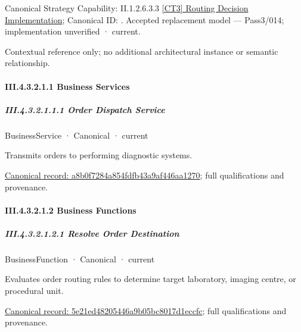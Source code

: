 {\small Canonical Strategy Capability: II.1.2.6.3.3 \hyperref[element:2272dc936e6a4243a12049cd007df5d5]{[CT3] Routing Decision Implementation}; Canonical ID: \texttt{}. Accepted replacement model — Pass3/014; implementation unverified · current.}\par
Contextual reference only; no additional architectural instance or semantic relationship.\par
\paragraph*{III.4.3.2.1.1 Business Services}
\label{navigation:III.4.3.2.1.1}

\subparagraph*{III.4.3.2.1.1.1 Order Dispatch Service}
\label{navigation:III.4.3.2.1.1.1}

\label{element:a8b0f7284a854fdfb43a9af446aa1270}
{\small BusinessService · Canonical · current}\par

Transmits orders to performing diagnostic systems.


{\footnotesize \href{../../../../../../../../continuum/business/business-service/a8b0f7284a854fdfb43a9af446aa1270.md}{Canonical record: a8b0f7284a854fdfb43a9af446aa1270}; full qualifications and provenance.}\par
\paragraph*{III.4.3.2.1.2 Business Functions}
\label{navigation:III.4.3.2.1.2}

\subparagraph*{III.4.3.2.1.2.1 Resolve Order Destination}
\label{navigation:III.4.3.2.1.2.1}

\label{element:5e21ed48205446a9b05bc8017d1eccfc}
{\small BusinessFunction · Canonical · current}\par

Evaluates order routing rules to determine target laboratory, imaging centre, or procedural unit.


{\footnotesize \href{../../../../../../../../continuum/business/business-function/5e21ed48205446a9b05bc8017d1eccfc.md}{Canonical record: 5e21ed48205446a9b05bc8017d1eccfc}; full qualifications and provenance.}\par
